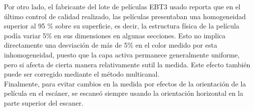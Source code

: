 Por otro lado, el fabricante del lote de películas EBT3 usado reporta que en el último control de calidad realizado, las películas presentaban una homogeneidad superior al 95 \% sobre su superficie, es decir, la estructura física de la película podía variar 5\% en sus dimensiones en algunas secciones. Esto no implica directamente una desviación de más de 5\% en el color medido por esta inhomogeneidad, puesto que la capa activa permanece generalmente uniforme, pero si afecta de cierta manera relativamente sutil la medida. Este efecto también puede ser corregido mediante el método multicanal. \\ 



Finalmente, para evitar cambios en la medida por efectos de la orientación de la película en el escáner, se escaneó siempre usando la orientación horizontal en la parte superior del escaner.\\








